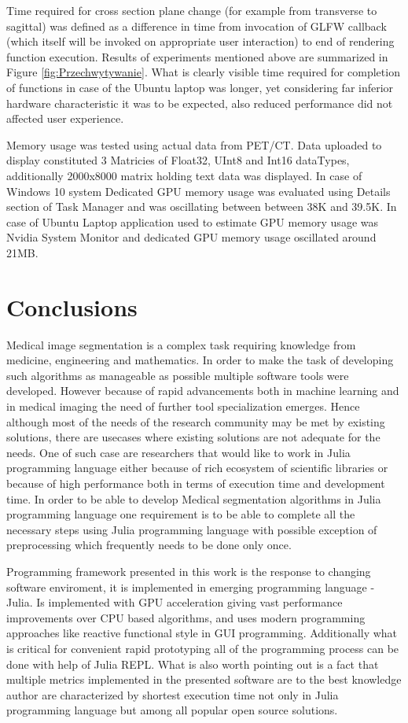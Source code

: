 \documentclass[preprint,12pt]{elsarticle}
\begin{document}
Time required for cross section plane change (for example from transverse to sagittal) was defined as a difference in time from invocation of GLFW callback (which itself will be invoked on appropriate user interaction) to end of rendering function execution.
Results of experiments mentioned above are summarized in Figure \ref{fig:Przechwytywanie}. What is clearly visible time required for completion of functions in case of the Ubuntu laptop was longer, yet considering far inferior hardware characteristic it was to be expected, also reduced performance did not affected user experience.


Memory usage was tested using actual data from PET/CT. Data uploaded to display constituted 3 Matricies of Float32, UInt8  and Int16 dataTypes, additionally 2000x8000 matrix holding text data was displayed. 
In case of Windows 10 system Dedicated GPU memory usage was evaluated using Details section of Task Manager and was oscillating between between 38K and 39.5K. In case of Ubuntu Laptop application used to estimate GPU memory usage was Nvidia System Monitor and dedicated GPU memory usage oscillated around 21MB. 

\section{Conclusions}
Medical image segmentation is a complex task requiring knowledge from medicine, engineering and mathematics. In order to make the task of developing such algorithms as manageable as possible multiple software tools were developed. However because of rapid advancements both in machine learning and in medical imaging the need of further tool specialization emerges. Hence although most of the needs of the research community may be met by existing solutions, there are usecases where existing solutions are not adequate for the needs. One of such case are researchers that would like to work in Julia programming language either because of rich ecosystem of scientific libraries or because of high performance both in terms of execution time and development time. In order to be able to develop Medical segmentation algorithms in  Julia programming language one requirement is to be able to complete all the necessary steps using Julia programming language with possible exception of preprocessing which frequently needs to be done only once.

Programming framework presented in this work is the response to changing software enviroment, it is implemented in emerging programming language - Julia. Is implemented with GPU acceleration giving vast performance improvements over CPU based algorithms, and uses modern programming approaches like reactive functional style in GUI programming. Additionally what is critical for convenient rapid prototyping all of the programming process can be done with help of Julia REPL. What is also worth pointing out is a fact that multiple metrics implemented in the presented software are to the best knowledge author are characterized by shortest execution time not only in Julia programming language but among all popular open source solutions. 
\end{document}
